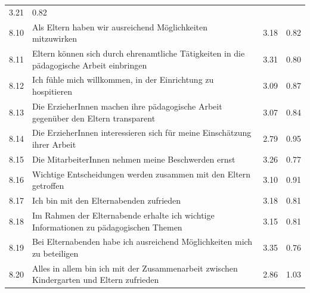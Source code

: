 \documentclass[12pt,a4paper]{article}
\begin{document}
\begin{table}[h]
\begin{tabularx}{\textwidth}{rXll}
 3.21&
          0.82\\
8.10& Als Eltern haben wir ausreichend Möglichkeiten mitzuwirken                                                                                                                                                                                                                                                     &
 3.18&
          0.82\\
8.11& Eltern können sich durch ehrenamtliche Tätigkeiten in die
        pädagogische Arbeit einbringen                                                                                                                                                                                            &
 3.31&
          0.80 \\ 
8.12& Ich fühle mich willkommen, in der Einrichtung zu hospitieren   &      
 3.09&
          0.87\\
8.13& Die ErzieherInnen machen ihre pädagogische Arbeit gegenüber
        den Eltern transparent                                                                                                                                                                                                                                            &
 3.07&
          0.84\\
8.14& Die ErzieherInnen interessieren sich für meine Einschätzung
        ihrer Arbeit  &
 2.79&
          0.95\\
8.15& Die MitarbeiterInnen nehmen meine Beschwerden ernst                                                                                                        &
 3.26&
          0.77\\
8.16& Wichtige Entscheidungen werden zusammen mit den Eltern
        getroffen                                                                                                &
 3.10&
          0.91\\
8.17& Ich bin mit den Elternabenden zufrieden                                              &
 3.18&
          0.81\\
8.18& Im Rahmen der Elternabende erhalte ich wichtige    
        Informationen zu pädagogischen Themen                                                                    &
 3.15&
          0.81\\
8.19& Bei Elternabenden habe ich ausreichend Möglichkeiten mich    
        zu beteiligen                                                                                 &
 3.35&
          0.76\\
8.20& Alles in allem bin ich mit der Zusammenarbeit zwischen  
        Kindergarten und Eltern zufrieden&
 2.86&
          1.03\\
\hline 
\end{tabularx} 
\end{table}
\FloatBarrier
\end{document}
